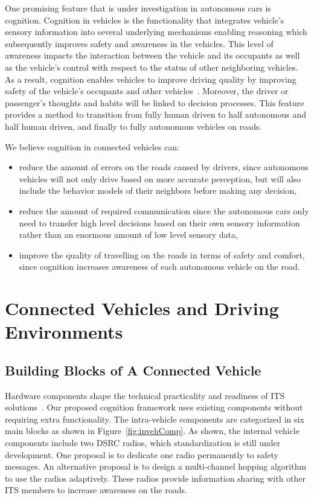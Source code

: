 \documentclass[journal, 11pt]{IEEEtran}
\begin{document}
One promising feature that is under investigation in autonomous cars is
cognition. {\color{red} Cognition in vehicles is the functionality that
integrates vehicle's sensory information into several underlying mechanisms
enabling reasoning which subsequently improves safety and awareness in the
vehicles. This level of awareness impacts the interaction between the vehicle
and its occupants as well as the vehicle's control with respect to the
status of other neighboring vehicles. As a result,} cognition enables vehicles
to improve driving quality by improving safety of the vehicle's occupants and
other vehicles~\cite{cogcar}. Moreover, the driver or passenger's thoughts and
habits will be linked to decision processes. This feature provides a method to
transition from fully human driven to half autonomous and half human driven, and
finally to fully autonomous vehicles on roads.

We believe cognition in connected vehicles can:

\begin{itemize}
  \item reduce the amount of errors on the roads caused by drivers, since
  autonomous vehicles will not only drive based on more accurate perception, but
  will also include the behavior models of their neighbors before making any
  decision,
  \item reduce the amount of required communication since the autonomous cars
  only need to transfer high level decisions based on their own sensory
  information rather than an enormous amount of low level sensory data,
  \item improve the quality of travelling on the roads in terms of safety and
  comfort, since cognition increases awareness of each autonomous vehicle on the
  road.
\end{itemize} 

\section{Connected Vehicles and Driving Environments}

\subsection{Building Blocks of A Connected Vehicle}

Hardware components shape the technical practicality and readiness of ITS
solutions~\cite{hardingNHTSA14}. Our proposed cognition framework uses existing
components without requiring extra functionality. The intra-vehicle components
are categorized in six main blocks as shown in Figure~\ref{fig:invehComp}. As
shown, the internal vehicle components include two DSRC radios, which
standardization is still under development. One proposal is to dedicate one
radio permanently to safety messages. An alternative proposal is to design a
multi-channel hopping algorithm to use the radios adaptively. These radios
provide information sharing with other ITS members to increase awareness on the
roads.
\end{document}

